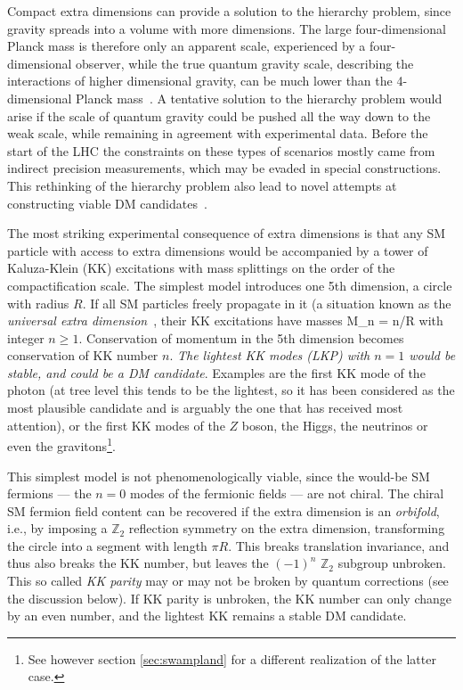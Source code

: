 Compact extra dimensions can provide a solution to the hierarchy problem, since gravity spreads into a volume with more dimensions. 
The large four-dimensional Planck mass is therefore only an apparent scale, experienced by a four-dimensional observer,
while the true quantum gravity scale, describing the interactions of higher dimensional gravity,
can be much lower than the 4-dimensional Planck mass~\cite{X-dim:hierarchy}. 
A tentative solution to the hierarchy problem would arise if the scale of quantum gravity could be pushed all the way down to the weak scale, 
while remaining in agreement with experimental data. 
Before the start of the LHC the constraints on these types of scenarios mostly came from indirect precision measurements, which may be evaded in special constructions. 
This rethinking of the hierarchy problem  also lead to novel attempts at constructing viable DM candidates~\cite{xdimDM}.

\medskip

The most striking experimental consequence of extra dimensions is that any SM particle 
with access to extra dimensions would be accompanied by a tower of Kaluza-Klein (KK) excitations
with mass splittings on the order of the compactification scale. 
The simplest model introduces one 5th dimension, a circle with radius $R$.
If all SM particles freely propagate in it (a situation known as the {\em universal extra dimension}~\cite{X-dim:hierarchy},
their KK excitations have masses 
\beq M_n  = n/R \eeq with integer $n\ge 1$.
Conservation of momentum in the 5th dimension becomes conservation of KK number $n$.
{\em The lightest KK modes (LKP) with $n=1$ would be stable, and could be a DM candidate}. Examples are the first KK mode of the photon
(at tree level this tends to be the lightest, so it has been considered as the most plausible candidate and is arguably the one that has received most attention), 
or the first KK modes of the $Z$ boson, the Higgs, the neutrinos or even the gravitons\footnote{See however section \ref{sec:swampland} for a different realization of the latter case.}.

This simplest model is not phenomenologically viable, since the would-be SM fermions --- the $n=0$ modes of the fermionic fields --- are not chiral.
The chiral SM fermion field content can be recovered if the extra dimension is an {\em orbifold}, i.e., 
by imposing a $\mathbb{Z}_2$ reflection symmetry on the extra dimension, 
transforming the circle into a segment with length $\pi R$.
This breaks translation invariance, and thus also breaks the KK number, but
 leaves the $(-1)^n$ $\mathbb{Z}_2$ subgroup unbroken. This so called {\em KK parity} may or may not be broken by quantum corrections (see the discussion below). If KK parity is unbroken, 
the KK number can only change by an even number, and the lightest KK remains a stable DM candidate.

